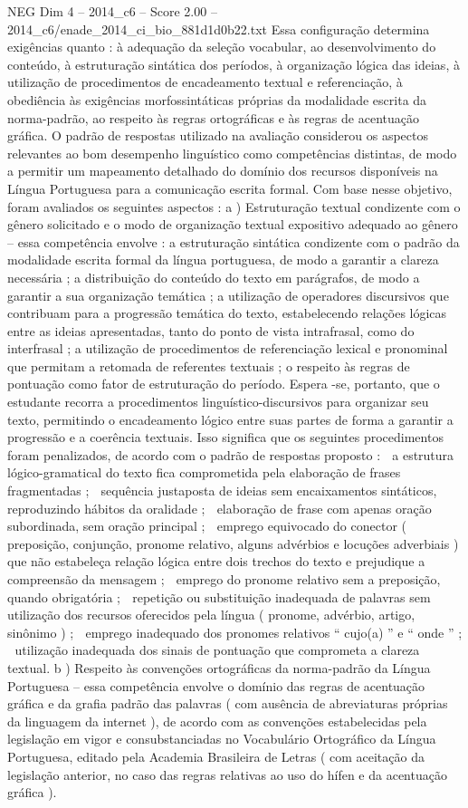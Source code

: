 \begin{textsample}{NEG Dim 4 – 2014\_c6 – Score 2.00 – 2014\_c6/enade\_2014\_ci\_bio\_881d1d0b22.txt}
Essa configuração determina exigências quanto : à adequação da seleção vocabular, ao desenvolvimento do conteúdo, à estruturação sintática dos períodos, à organização lógica das ideias, à utilização de procedimentos de encadeamento textual e referenciação, à obediência às exigências morfossintáticas próprias da modalidade escrita da norma-padrão, ao respeito às regras ortográficas e às regras de acentuação gráfica.
O padrão de respostas utilizado na avaliação considerou os aspectos relevantes ao bom desempenho linguístico como competências distintas, de modo a permitir um mapeamento detalhado do domínio dos recursos disponíveis na Língua Portuguesa para a comunicação escrita formal.
Com base nesse objetivo, foram avaliados os seguintes aspectos : a ) Estruturação textual condizente com o gênero solicitado e o modo de organização textual expositivo adequado ao gênero – essa competência envolve : a estruturação sintática condizente com o padrão da modalidade escrita formal da língua portuguesa, de modo a garantir a clareza necessária ; a distribuição do conteúdo do texto em parágrafos, de modo a garantir a sua organização temática ; a utilização de operadores discursivos que contribuam para a progressão temática do texto, estabelecendo relações lógicas entre as ideias apresentadas, tanto do ponto de vista intrafrasal, como do interfrasal ; a utilização de procedimentos de referenciação lexical e pronominal que permitam a retomada de referentes textuais ; o respeito às regras de pontuação como fator de estruturação do período.
Espera -se, portanto, que o estudante recorra a procedimentos linguístico-discursivos para organizar seu texto, permitindo o encadeamento lógico entre suas partes de forma a garantir a progressão e a coerência textuais.
Isso significa que os seguintes procedimentos foram penalizados, de acordo com o padrão de respostas proposto :  a estrutura lógico-gramatical do texto fica comprometida pela elaboração de frases fragmentadas ;  sequência justaposta de ideias sem encaixamentos sintáticos, reproduzindo hábitos da oralidade ;  elaboração de frase com apenas oração subordinada, sem oração principal ;  emprego equivocado do conector ( preposição, conjunção, pronome relativo, alguns advérbios e locuções adverbiais ) que não estabeleça relação lógica entre dois trechos do texto e prejudique a compreensão da mensagem ;  emprego do pronome relativo sem a preposição, quando obrigatória ;  repetição ou substituição inadequada de palavras sem utilização dos recursos oferecidos pela língua ( pronome, advérbio, artigo, sinônimo ) ;  emprego inadequado dos pronomes relativos “ cujo(a) ” e “ onde ” ;  utilização inadequada dos sinais de pontuação que comprometa a clareza textual. b ) Respeito às convenções ortográficas da norma-padrão da Língua Portuguesa – essa competência envolve o domínio das regras de acentuação gráfica e da grafia padrão das palavras ( com ausência de abreviaturas próprias da linguagem da internet ), de acordo com as convenções estabelecidas pela legislação em vigor e consubstanciadas no Vocabulário Ortográfico da Língua Portuguesa, editado pela Academia Brasileira de Letras ( com aceitação da legislação anterior, no caso das regras relativas ao uso do hífen e da acentuação gráfica ).

\end{textsample}
